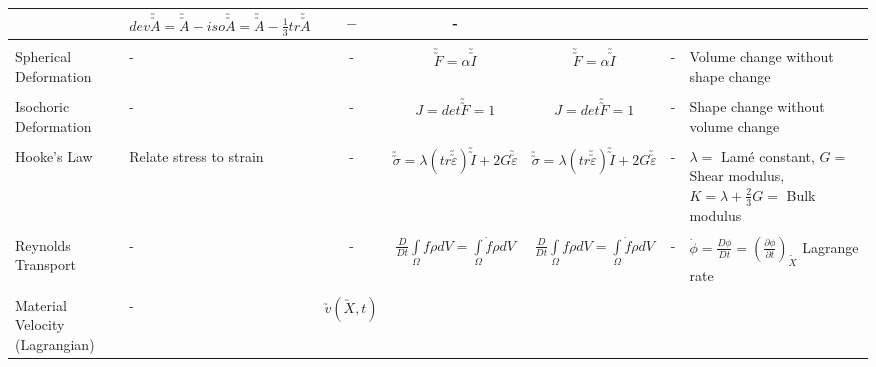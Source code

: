 \documentclass[10pt]{article}
\begin{document}
\begin{center}
\begin{tabular}{l m{3in} c c c c m{5in}}
&%
$ dev\utilde{\utilde{A}} =  \utilde{\utilde{A}}-iso\utilde{\utilde{A}} = \utilde{\utilde{A}}-\frac{1}{3}tr\utilde{\utilde{A}} $
&%
$ - $
&%
-
\\[1ex]
\hline
\\[-1ex]
Spherical Deformation
&%
-
&%
-
&%
$ \utilde{\utilde{F}}=\alpha\utilde{\utilde{I}} $
&%
$ \utilde{\utilde{F}}=\alpha\utilde{\utilde{I}} $
&%
-
%
&%
Volume change without shape change
\\[1ex]
\hline
\\[-1ex]
Isochoric Deformation
&%
-
&%
-
&%
$ J = det\utilde{\utilde{F}} = 1 $
&%
$ J = det\utilde{\utilde{F}} = 1 $
&%
-
&%
Shape change without volume change
\\[1ex]
\hline
\\[-1ex]
Hooke's Law
&%
Relate stress to strain
&%
-
&%
$ \utilde{\utilde{\sigma}} = \lambda(tr\utilde{\utilde{\varepsilon}})\utilde{\utilde{I}} + 2G\utilde{\utilde{\varepsilon}} $
&%
$ \utilde{\utilde{\sigma}} = \lambda(tr\utilde{\utilde{\varepsilon}})\utilde{\utilde{I}} + 2G\utilde{\utilde{\varepsilon}} $
&%
-
&%
$\lambda =$ Lam\'{e} constant, $G =$ Shear modulus, $K = \lambda + \frac{2}{3}G =$ Bulk modulus
\\[1ex]
\hline
\\[-1ex]
Reynolds Transport
&%
-
&%
-
&%
$ \frac{D}{Dt}\int\limits_{\Omega}f\rho dV=\int\limits_{\Omega}\dot{f}\rho dV $
&%
$ \frac{D}{Dt}\int\limits_{\Omega}f\rho dV=\int\limits_{\Omega}\dot{f}\rho dV $
&%
-
&%
$ \dot{\phi} = \frac{D\phi}{Dt} = (\frac{\partial \phi}{\partial t})_{\utilde{X}} $ Lagrange rate
\\[1ex]
\hline
\\[-1ex]
Material Velocity (Lagrangian)
&%
-
&%
$ \utilde{v}(\utilde{X},t) $

\end{tabular}
\end{center}
\end{document}
